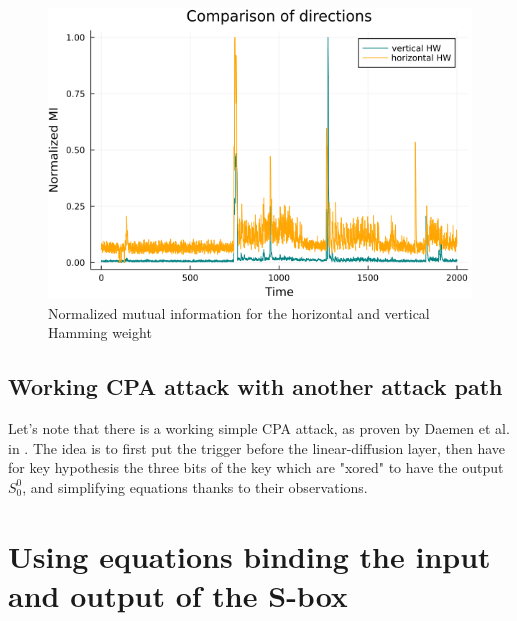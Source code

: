 \documentclass[a4paper,11pt,twocolumn]{article}
\begin{document}
	\begin{figure}[h]
		\centering
		\includegraphics[scale=0.4]{h_and_v_one_byte}
		\caption{Normalized mutual information for the horizontal and vertical Hamming weight}
		\label{hvval}
	\end{figure}
	
	\subsection{Working CPA attack with another attack path}
	Let's note that there is a working simple CPA attack, as proven by Daemen et al. in \cite{cpa_lin}. The idea is to first put the trigger before the linear-diffusion layer, then have for key hypothesis the three bits of the key which are "xored" to have the output $S_0^0$, and simplifying equations thanks to their observations.
	
	\section{Using equations binding the input and output of the S-box}
\end{document}
